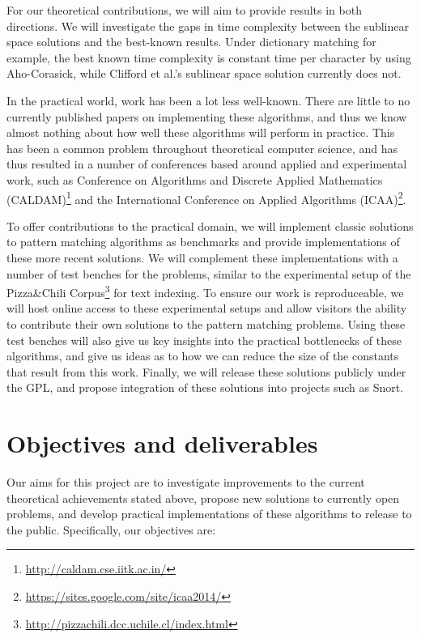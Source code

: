 \documentclass[a4paper,11pt]{article}
\begin{document}
    For our theoretical contributions, we will aim to provide results in both directions. We will investigate the gaps in time complexity between the sublinear space solutions and the best-known results. Under dictionary matching for example, the best known time complexity is constant time per character by using Aho-Corasick, while Clifford et al.'s sublinear space solution currently does not.

    In the practical world, work has been a lot less well-known. There are little to no currently published papers on implementing these algorithms, and thus we know almost nothing about how well these algorithms will perform in practice. This has been a common problem throughout theoretical computer science, and has thus resulted in a number of conferences based around applied and experimental work, such as Conference on Algorithms and Discrete Applied Mathematics (CALDAM)\footnote{\url{http://caldam.cse.iitk.ac.in/}} and the International Conference on Applied Algorithms (ICAA)\footnote{\url{https://sites.google.com/site/icaa2014/}}.

    To offer contributions to the practical domain, we will implement classic solutions to pattern matching algorithms as benchmarks and provide implementations of these more recent solutions. We will complement these implementations with a number of test benches for the problems, similar to the experimental setup of the Pizza\&Chili Corpus\footnote{\url{http://pizzachili.dcc.uchile.cl/index.html}} for text indexing. To ensure our work is reproduceable, we will host online access to these experimental setups and allow visitors the ability to contribute their own solutions to the pattern matching problems. Using these test benches will also give us key insights into the practical bottlenecks of these algorithms, and give us ideas as to how we can reduce the size of the constants that result from this work. Finally, we will release these solutions publicly under the GPL, and propose integration of these solutions into projects such as Snort.

    \section{Objectives and deliverables}

    Our aims for this project are to investigate improvements to the current theoretical achievements stated above, propose new solutions to currently open problems, and develop practical implementations of these algorithms to release to the public. Specifically, our objectives are:
\end{document}
